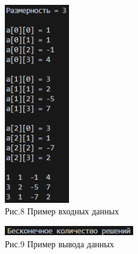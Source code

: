 \documentclass[12pt,a4paper]{scrartcl}
\begin{document}
\begin{figure}
  \begin{center}
    \includegraphics[width=0.25\textwidth]{vhoddan3.png}
  \end{center}
  \caption{Рис.8  Пример входных данных}\label{fig:ex}
\end{figure}

\begin{figure}
  \begin{center}
    \includegraphics[width=0.5\textwidth]{infinityresh.png}
  \end{center}
  \caption{Рис.9  Пример вывода данных}\label{fig:ex}
\end{figure}
\end{document}

